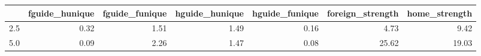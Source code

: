 \begin{tabular}{lrrrrrr}
\toprule
 & fguide_hunique & fguide_funique & hguide_hunique & hguide_funique & foreign_strength & home_strength \\
\midrule
2.5 & 0.32 & 1.51 & 1.49 & 0.16 & 4.73 & 9.42 \\
5.0 & 0.09 & 2.26 & 1.47 & 0.08 & 25.62 & 19.03 \\
\bottomrule
\end{tabular}
